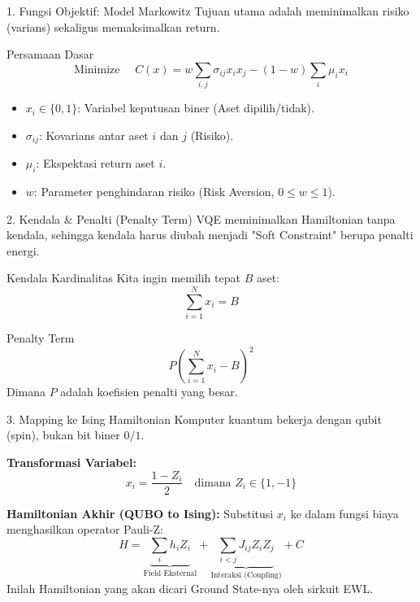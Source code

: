 \documentclass{beamer}
\begin{document}
\begin{frame}{1. Fungsi Objektif: Model Markowitz}
    Tujuan utama adalah meminimalkan risiko (varians) sekaligus memaksimalkan return.
    
    \begin{block}{Persamaan Dasar}
    $$ \text{Minimize } \quad C(x) = w \sum_{i,j} \sigma_{ij} x_i x_j - (1-w) \sum_i \mu_i x_i $$
    \end{block}
    
    \begin{itemize}
        \item $x_i \in \{0, 1\}$: Variabel keputusan biner (Aset dipilih/tidak).
        \item $\sigma_{ij}$: Kovarians antar aset $i$ dan $j$ (Risiko).
        \item $\mu_i$: Ekspektasi return aset $i$.
        \item $w$: Parameter penghindaran risiko (Risk Aversion, $0 \le w \le 1$).
    \end{itemize}
\end{frame}

\begin{frame}{2. Kendala \& Penalti (Penalty Term)}
    VQE meminimalkan Hamiltonian tanpa kendala, sehingga kendala harus diubah menjadi "Soft Constraint" berupa penalti energi.
    
    \begin{block}{Kendala Kardinalitas}
    Kita ingin memilih tepat $B$ aset:
    $$ \sum_{i=1}^N x_i = B $$
    \end{block}
    
    \begin{alertblock}{Penalty Term}
    $$ P \left( \sum_{i=1}^N x_i - B \right)^2 $$
    Dimana $P$ adalah koefisien penalti yang besar.
    \end{alertblock}
\end{frame}

\begin{frame}{3. Mapping ke Ising Hamiltonian}
    Komputer kuantum bekerja dengan qubit (spin), bukan bit biner $0/1$.
    
    \textbf{Transformasi Variabel:}
    $$ x_i = \frac{1 - Z_i}{2} \quad \text{dimana } Z_i \in \{1, -1\} $$
    
    \vspace{0.3cm}
    \textbf{Hamiltonian Akhir (QUBO to Ising):}
    Substitusi $x_i$ ke dalam fungsi biaya menghasilkan operator Pauli-Z:
    \begin{equation*}
        H = \underbrace{\sum_i h_i Z_i}_{\text{Field Eksternal}} + \underbrace{\sum_{i<j} J_{ij} Z_i Z_j}_{\text{Interaksi (Coupling)}} + C
    \end{equation*}
    Inilah Hamiltonian yang akan dicari Ground State-nya oleh sirkuit EWL.
\end{frame}
\end{document}
